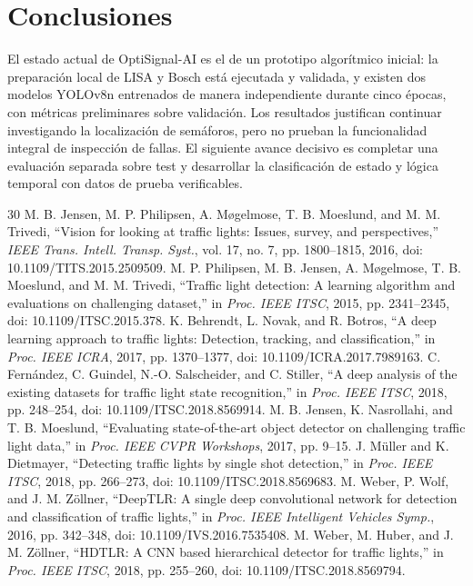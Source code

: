 \documentclass[conference]{IEEEtran}
\begin{document}
\section{Conclusiones}
El estado actual de OptiSignal-AI es el de un prototipo algorítmico inicial: la preparación local de LISA y Bosch está ejecutada y validada, y existen dos modelos YOLOv8n entrenados de manera independiente durante cinco épocas, con métricas preliminares sobre validación. Los resultados justifican continuar investigando la localización de semáforos, pero no prueban la funcionalidad integral de inspección de fallas. El siguiente avance decisivo es completar una evaluación separada sobre test y desarrollar la clasificación de estado y lógica temporal con datos de prueba verificables.

\begin{thebibliography}{30}
 M. B. Jensen, M. P. Philipsen, A. M\o gelmose, T. B. Moeslund, and M. M. Trivedi, ``Vision for looking at traffic lights: Issues, survey, and perspectives,'' \emph{IEEE Trans. Intell. Transp. Syst.}, vol. 17, no. 7, pp. 1800--1815, 2016, doi: 10.1109/TITS.2015.2509509.
 M. P. Philipsen, M. B. Jensen, A. M\o gelmose, T. B. Moeslund, and M. M. Trivedi, ``Traffic light detection: A learning algorithm and evaluations on challenging dataset,'' in \emph{Proc. IEEE ITSC}, 2015, pp. 2341--2345, doi: 10.1109/ITSC.2015.378.
 K. Behrendt, L. Novak, and R. Botros, ``A deep learning approach to traffic lights: Detection, tracking, and classification,'' in \emph{Proc. IEEE ICRA}, 2017, pp. 1370--1377, doi: 10.1109/ICRA.2017.7989163.
 C. Fern\'andez, C. Guindel, N.-O. Salscheider, and C. Stiller, ``A deep analysis of the existing datasets for traffic light state recognition,'' in \emph{Proc. IEEE ITSC}, 2018, pp. 248--254, doi: 10.1109/ITSC.2018.8569914.
 M. B. Jensen, K. Nasrollahi, and T. B. Moeslund, ``Evaluating state-of-the-art object detector on challenging traffic light data,'' in \emph{Proc. IEEE CVPR Workshops}, 2017, pp. 9--15.
 J. M\"uller and K. Dietmayer, ``Detecting traffic lights by single shot detection,'' in \emph{Proc. IEEE ITSC}, 2018, pp. 266--273, doi: 10.1109/ITSC.2018.8569683.
 M. Weber, P. Wolf, and J. M. Z\"ollner, ``DeepTLR: A single deep convolutional network for detection and classification of traffic lights,'' in \emph{Proc. IEEE Intelligent Vehicles Symp.}, 2016, pp. 342--348, doi: 10.1109/IVS.2016.7535408.
 M. Weber, M. Huber, and J. M. Z\"ollner, ``HDTLR: A CNN based hierarchical detector for traffic lights,'' in \emph{Proc. IEEE ITSC}, 2018, pp. 255--260, doi: 10.1109/ITSC.2018.8569794.

\end{thebibliography}
\end{document}
